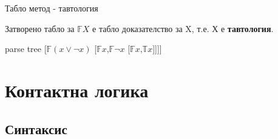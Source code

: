 \documentclass[14pt, aspectratio=169]{beamer}
\newcommand\ST{\mathbb{T}}
\newcommand\SF{\mathbb{F}}
\begin{document}
\begin{frame}{Табло метод - тавтология}
	\begin{lemma}
		Затворено табло за $\SF X$ е табло доказателство за X, т.е. Х е \textbf{тавтология}.
	\end{lemma}
	\small
	\begin{example}
		\begin{center}
		\begin{forest}
			parse tree
			[$\SF (x \lor \neg x)$ [$\SF x \mbox{,} \SF \neg x$ [$\SF x \mbox{,} \ST x$]]]]
		\end{forest}
		\end{center}
	\end{example}
\end{frame}



\section{Контактна логика}
\subsection{Синтаксис}

\end{document}
